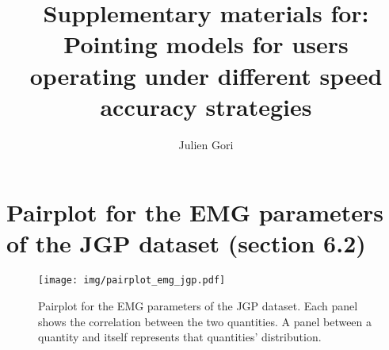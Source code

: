 \documentclass{article}
\title{Supplementary materials for: Pointing models for users operating under
different speed accuracy strategies  }
\author{Julien Gori}
\date{}
\begin{document}
\maketitle

\section{Pairplot for the EMG parameters of the JGP dataset (section 6.2)}

\begin{figure}[htbp]
    \centering
    \texttt{[image: img/pairplot\_emg\_jgp.pdf]}
    \caption{Pairplot for the EMG parameters of the JGP dataset. Each panel shows the correlation between the two quantities. A panel between a quantity and itself represents that quantities' distribution.}
\end{figure}


\end{document}
